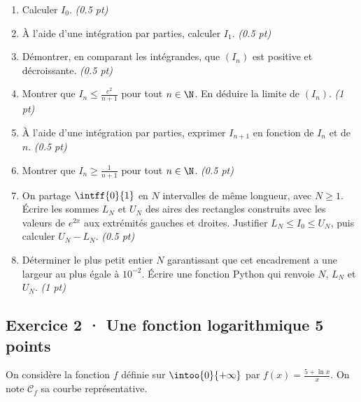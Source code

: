 \begin{enumerate}

\item Calculer $I_0$. \hfill\textit{(\num{0,5} pt)}

\item À l'aide d'une intégration par parties, calculer $I_1$. \hfill\textit{(\num{0,5} pt)}

\item Démontrer, en comparant les intégrandes, que $(I_n)$ est positive et décroissante. \hfill\textit{(\num{0,5} pt)}

\item Montrer que $I_n\le\frac{e^{2}}{n+1}$ pour tout $n\in\N$. En déduire la limite de $(I_n)$. \hfill\textit{(1 pt)}

\item À l'aide d'une intégration par parties, exprimer $I_{n+1}$ en fonction de $I_n$ et de $n$. \hfill\textit{(\num{0,5} pt)}

\item Montrer que $I_n\ge\frac1{n+1}$ pour tout $n\in\N$. \hfill\textit{(\num{0,5} pt)}

\item On partage $\intff{0}{1}$ en $N$ intervalles de même longueur, avec $N\ge1$. Écrire les sommes $L_N$ et $U_N$ des aires des rectangles construits avec les valeurs de $e^{2x}$ aux extrémités gauches et droites. Justifier $L_N\le I_0\le U_N$, puis calculer $U_N-L_N$. \hfill\textit{(\num{0,5} pt)}

\item Déterminer le plus petit entier $N$ garantissant que cet encadrement a une largeur au plus égale à $10^{-2}$. Écrire une fonction Python qui renvoie $N$, $L_N$ et $U_N$. \hfill\textit{(1 pt)}

\end{enumerate}

\subsection*{Exercice 2 · Une fonction logarithmique \hfill 5 points}On considère la fonction $f$ définie sur $\intoo{0}{+\infty}$ par $f(x)=\frac{5+\ln x}x$. On note $\mathcal C_f$ sa courbe représentative.

